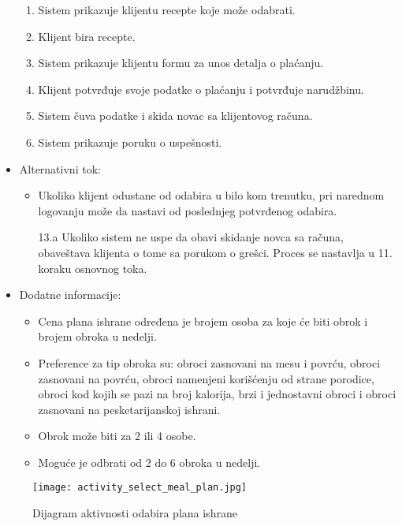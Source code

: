 \begin{itemize}
\begin{enumerate}
            \item Sistem prikazuje klijentu recepte koje može odabrati.
            \item Klijent bira recepte.
            \item Sistem prikazuje klijentu formu za unos detalja o plaćanju.
            \item Klijent potvrđuje svoje podatke o plaćanju i potvrđuje narudžbinu.
            \item Sistem čuva podatke i skida novac sa klijentovog računa.
            \item Sistem prikazuje poruku o uspešnosti. 
        \end{enumerate}
    \item Alternativni tok:
        \begin{itemize}
            \item Ukoliko klijent odustane od odabira u bilo kom trenutku, pri narednom logovanju može da nastavi od poslednjeg potvrđenog odabira.
            \item[13.a] Ukoliko sistem ne uspe da obavi skidanje novca sa računa, obaveštava klijenta o tome sa porukom o grešci. Proces se nastavlja u 11. koraku osnovnog toka.
        \end{itemize}
    \item Dodatne informacije:
        \begin{itemize}
            \item Cena plana ishrane određena je brojem osoba za koje će biti obrok i brojem obroka u nedelji.
            \item Preference za tip obroka su: obroci zasnovani na mesu i povrću, obroci zasnovani na povrću, obroci namenjeni korišćenju od strane porodice, obroci kod kojih se pazi na broj kalorija, brzi i jednostavni obroci i obroci zasnovani na pesketarijanskoj ishrani. 
            \item Obrok može biti za 2 ili 4 osobe.
            \item Moguće je odbrati od 2 do 6 obroka u nedelji.
        \end{itemize}
\end{itemize}

\begin{figure}[H]
\begin{center}
\texttt{[image: activity\_select\_meal\_plan.jpg]}
\end{center}
    \caption{Dijagram aktivnosti odabira plana ishrane}
\label{fig:ActivitySelectMealPlan}
\end{figure}
